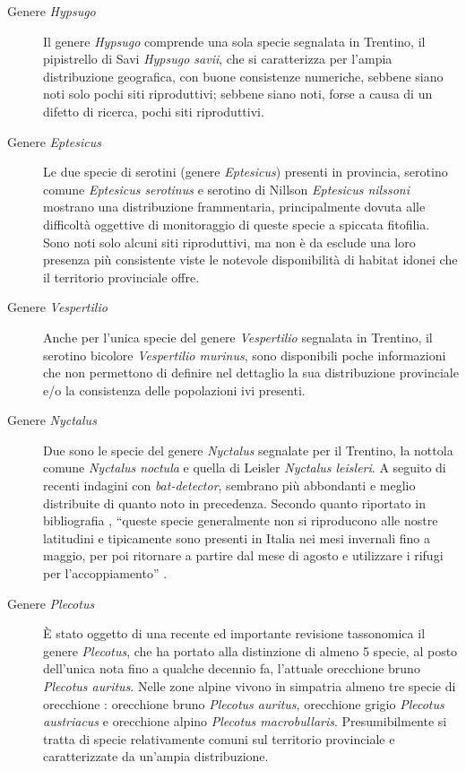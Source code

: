 \documentclass[10pt,twoside,openany,x11names,svgnames,italian,a5paper,dvipsnames,table]{memoir}
\begin{document}
\begin{description}
  \item [Genere \emph{Hypsugo}]
  Il genere \emph{Hypsugo} comprende una sola specie segnalata in Trentino, il pipistrello di Savi \emph{Hypsugo savii}, che si caratterizza per l’ampia distribuzione geografica, con buone consistenze numeriche, sebbene siano noti solo pochi siti riproduttivi; sebbene siano noti, forse a causa di un difetto di ricerca, pochi siti riproduttivi.
  \item [Genere \emph{Eptesicus}]
  Le due specie di serotini (genere \emph{Eptesicus}) presenti in provincia, serotino comune \emph{Eptesicus serotinus} e serotino di Nillson \emph{Eptesicus nilssoni} mostrano una distribuzione frammentaria, principalmente dovuta alle difficoltà oggettive di monitoraggio di queste specie a spiccata fitofilia. Sono noti solo alcuni siti riproduttivi, ma non è da esclude una loro presenza più consistente viste le notevole disponibilità di habitat idonei che il territorio provinciale offre.
  \item [Genere \emph{Vespertilio}]
  Anche per l’unica specie del genere \emph{Vespertilio} segnalata in Trentino, il serotino bicolore \emph{Vespertilio murinus}, sono disponibili poche informazioni che non permettono di definire nel dettaglio la sua distribuzione provinciale e/o la consistenza delle popolazioni ivi presenti.
  \item [Genere \emph{Nyctalus}]
  Due sono le specie del genere \emph{Nyctalus} segnalate per il Trentino, la nottola comune \emph{Nyctalus noctula} e quella di Leisler \emph{Nyctalus leisleri}. A seguito di recenti indagini con \emph{bat-detector}, sembrano più abbondanti e meglio distribuite di quanto noto in precedenza. Secondo quanto riportato in bibliografia \cite{Agnelli} \cite{Lanza}, “queste specie generalmente non si riproducono alle nostre latitudini e tipicamente sono presenti in Italia nei mesi invernali fino a maggio, per poi ritornare a partire dal mese di agosto e utilizzare i rifugi per l’accoppiamento” \cite{Agnelli} \cite{Lanza}.
  \item [Genere \emph{Plecotus}]
  È stato oggetto di una recente ed importante revisione tassonomica il genere \emph{Plecotus}, che ha portato alla distinzione di almeno 5 specie, al posto dell'unica nota fino a qualche decennio fa, l’attuale orecchione bruno \emph{Plecotus auritus}. Nelle zone alpine vivono in simpatria almeno tre specie di orecchione \cite{Lanza}: orecchione bruno \emph{Plecotus auritus}, orecchione grigio \emph{Plecotus austriacus} e orecchione alpino \emph{Plecotus macrobullaris}. Presumibilmente si tratta di specie relativamente comuni sul territorio provinciale e caratterizzate da un’ampia distribuzione.

\end{description}
\end{document}
